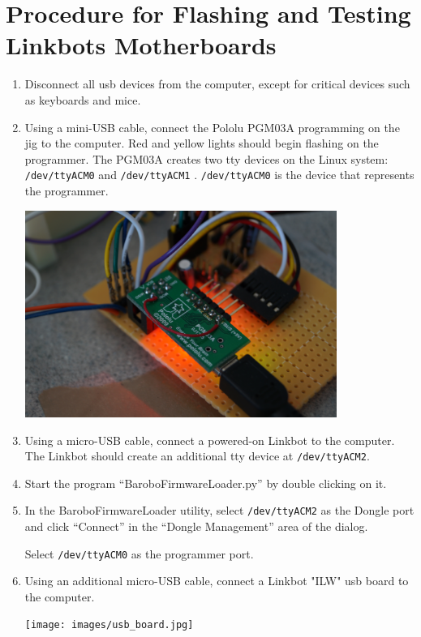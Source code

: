 \documentclass{article}
\begin{document}
\section{\label{sec:flashMainBoard}Procedure for Flashing and Testing Linkbots Motherboards}
\begin{enumerate}
\item Disconnect all usb devices from the computer, except for critical devices
   such as keyboards and mice.
\item Using a mini-USB cable, connect the Pololu PGM03A programming on the jig to
   the computer. Red and yellow lights should begin flashing on the programmer.
   The PGM03A creates two tty devices on the Linux system: \texttt{/dev/ttyACM0} and
   \texttt{/dev/ttyACM1} . \texttt{/dev/ttyACM0} is the device that represents the programmer.

   \begin{center}
   \includegraphics[width=4in]{images/programmer.jpg}
   \end{center}

\item Using a micro-USB cable, connect a powered-on Linkbot to the computer. The
   Linkbot should create an additional tty device at \texttt{/dev/ttyACM2}.
\item Start the program ``BaroboFirmwareLoader.py'' by double clicking on it.
\item In the BaroboFirmwareLoader utility, select \texttt{/dev/ttyACM2} as the Dongle
   port and click ``Connect'' in the ``Dongle Management'' area of the dialog. 

   Select \texttt{/dev/ttyACM0} as the programmer port.
\item Using an additional micro-USB cable, connect a Linkbot "ILW" usb board to
   the computer.

   \begin{center}
   \texttt{[image: images/usb\_board.jpg]}
   \end{center}


\end{enumerate}
\end{document}
